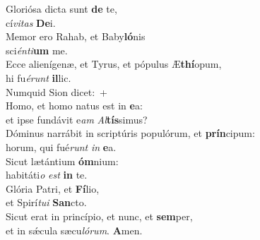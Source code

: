 \evenverse Gloriósa dicta sunt \textbf{de} te,~\*\\
\evenverse cí\textit{vi}\textit{tas} \textbf{De}i.\\
\oddverse Memor ero Rahab, et Baby\textbf{ló}nis~\*\\
\oddverse sci\textit{én}\textit{ti}\textbf{um} me.\\
\evenverse Ecce alienígenæ, et Tyrus, et pópulus Æ\textbf{thí}opum,~\*\\
\evenverse hi fu\textit{é}\textit{runt} \textbf{il}lic.\\
\oddverse Numquid Sion dicet:~+\\
\oddverse  Homo, et homo natus est in \textbf{e}a:~\*\\
\oddverse et ipse fundávit e\textit{am} \textit{Al}\textbf{tís}simus?\\
\evenverse Dóminus narrábit in scriptúris populórum, et \textbf{prín}cipum:~\*\\
\evenverse horum, qui fué\textit{runt} \textit{in} \textbf{e}a.\\
\oddverse Sicut lætántium \textbf{óm}nium:~\*\\
\oddverse habitáti\textit{o} \textit{est} \textbf{in} te.\\
\evenverse Glória Patri, et \textbf{Fí}lio,~\*\\
\evenverse et Spirí\textit{tu}\textit{i} \textbf{San}cto.\\
\oddverse Sicut erat in princípio, et nunc, et \textbf{sem}per,~\*\\
\oddverse et in sǽcula sæcu\textit{ló}\textit{rum}. \textbf{A}men.\\
